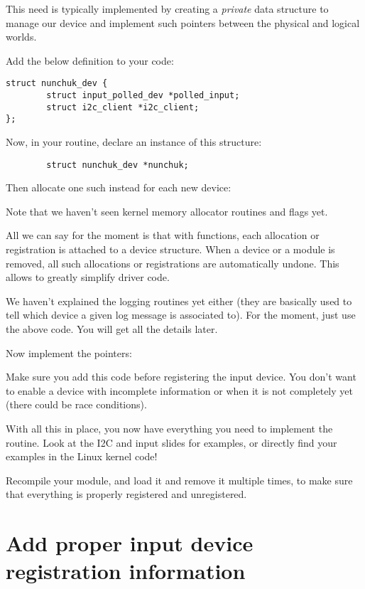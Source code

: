 This need is typically implemented by creating a {\em private} data
structure to manage our device and implement such pointers between
the physical and logical worlds.

Add the below definition to your code:

\begin{verbatim}
struct nunchuk_dev {
        struct input_polled_dev *polled_input;
        struct i2c_client *i2c_client;
};
\end{verbatim}

Now, in your  routine, declare an instance of
this structure:

\begin{verbatim}
        struct nunchuk_dev *nunchuk;
\end{verbatim}

Then allocate one such instead for each new device:


Note that we haven't seen kernel memory allocator routines and flags
yet.

All we can say for the moment is that with  functions, 
each allocation or registration
is attached to a device structure. When a device or a module is removed,
all such allocations or registrations are automatically undone. This
allows to greatly simplify driver code.

We haven't explained the  logging routines yet either
(they are basically used to tell which device a given log message is
associated to).  For the moment, just use the above code. You will get
all the details later.

Now implement the pointers: 


Make sure you add this code before registering the input device. You
don't want to enable a device with incomplete information or when it is
not completely yet (there could be race conditions). 

With all this in place, you now have everything you need to implement
the  routine. Look at the I2C and input slides for
examples, or directly find your examples in the Linux kernel code!

Recompile your module, and load it and remove it multiple times, to
make sure that everything is properly registered and unregistered.

\section{Add proper input device registration information}

